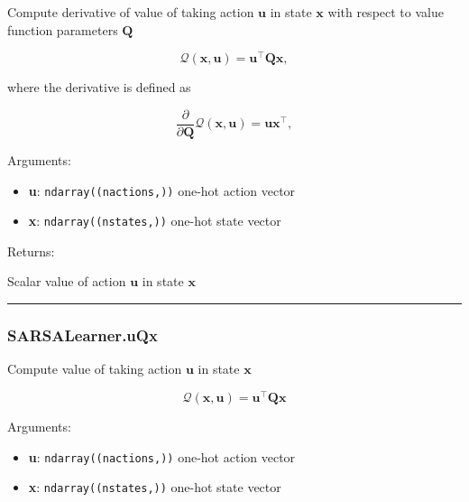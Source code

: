 \begin{Shaded}
\begin{Highlighting}[]
\end{Highlighting}
\end{Shaded}

Compute derivative of value of taking action \(\mathbf u\) in state
\(\mathbf x\) with respect to value function parameters \(\mathbf Q\)

\[
\mathcal Q(\mathbf x, \mathbf u) = \mathbf u^\top \mathbf Q \mathbf x,
\]

where the derivative is defined as

\[
\frac{\partial}{\partial \mathbf Q} \mathcal Q(\mathbf x, \mathbf u) = \mathbf u \mathbf x^\top,
\]

Arguments:

\begin{itemize}
\tightlist
\item
  \textbf{u}: \texttt{ndarray((nactions,))} one-hot action vector
\item
  \textbf{x}: \texttt{ndarray((nstates,))} one-hot state vector
\end{itemize}

Returns:

Scalar value of action \(\mathbf u\) in state \(\mathbf x\)

\begin{center}\rule{0.5\linewidth}{\linethickness}\end{center}

\subsubsection{SARSALearner.uQx}\label{sarsalearner.uqx}

\begin{Shaded}
\begin{Highlighting}[]
\end{Highlighting}
\end{Shaded}

Compute value of taking action \(\mathbf u\) in state \(\mathbf x\)

\[
\mathcal Q(\mathbf x, \mathbf u) = \mathbf u^\top \mathbf Q \mathbf x
\]

Arguments:

\begin{itemize}
\tightlist
\item
  \textbf{u}: \texttt{ndarray((nactions,))} one-hot action vector
\item
  \textbf{x}: \texttt{ndarray((nstates,))} one-hot state vector
\end{itemize}

